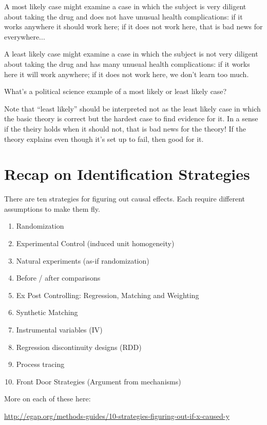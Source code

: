\documentclass[11pt]{article}
\begin{document}
A most likely case might examine a case in which the subject is very diligent about taking the drug and does not have unusual health complications: if it works anywhere it should work here; if it does not work here, that is bad news for everywhere...
 
A least likely case might examine a case in which the subject is not very diligent about taking the drug and has many unusual health complications: if it works here it will work anywhere; if it does not work here, we don't learn too much. 

What's a political science example of a most likely or least likely case?

Note that ``least likely'' should be interpreted not as the least likely case in which the basic theory is correct but the hardest case to find evidence for it. In a sense if the theiry holds when it should not, that is bad news for the theory! If the theory explains even though it's set up to fail, then good for it.

\newpage
\section{Recap on Identification Strategies}
There are ten strategies for figuring out causal effects. Each require different assumptions to make them fly.

\begin{enumerate}
\item Randomization

\item Experimental Control (induced unit homogeneity)

\item Natural experiments (as-if randomization)

\item Before / after comparisons

\item  Ex Post Controlling: Regression,  Matching and Weighting

\item Synthetic Matching

\item  Instrumental variables (IV)
		

\item  Regression discontinuity designs (RDD)

\item  Process tracing

\item Front Door Strategies (Argument from mechanisms)

\end{enumerate}

More on each of these here:

\url{http://egap.org/methods-guides/10-strategies-figuring-out-if-x-caused-y}
\end{document}
